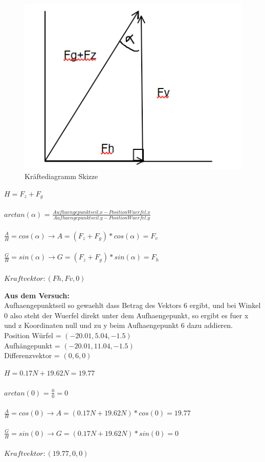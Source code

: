 \documentclass[../main.tex]{subfiles}
\begin{document}
     \begin{figure}[H]
               \begin{center}
                   \centerline{\includegraphics[width=155mm]{./images/Lab3Unity/KraefteDiagramm.png}}
                   \caption{Kräftediagramm Skizze}
                   \label{fig:KräfteDiagramm}
               \end{center}
     \end{figure}
\begin{mdframed}
$H = F_z +F_g$\\\\
$arctan(\alpha)$ = $\frac{Aufhaengepunktseil.x-Position Wuerfel.x }{Aufhaengepunktseil.y-Position Wuerfel.y }$\\\\
$\frac{A}{H}= cos(\alpha) \rightarrow A = (F_z + F_g) * cos(\alpha)= F_v$\\\\
$\frac{G}{H}= sin(\alpha) \rightarrow G = (F_z + F_g) * sin(\alpha)= F_h$\\\\
$Kraftvektor: (Fh,Fv,0)$
\end{mdframed}
\textbf {Aus dem Versuch:\\}
Aufhaengepunktseil so gewaehlt dass Betrag des Vektors 6 ergibt, und bei Winkel 0 also steht der Wuerfel direkt unter dem Aufhaengepunkt, so ergibt es fuer x und z Koordinaten null und zu y beim Aufhaengepunkt 6 dazu addieren.\\
Position Würfel = $(-20.01,5.04,-1.5)$\\
Aufhängepunkt = $(-20.01,11.04,-1.5)$\\
Differenzvektor = $(0,6,0)$\\
\begin{mdframed}
$H = 0.17N +19.62N = 19.77$\\\\
$arctan(0)$ = $\frac{0}{0} = 0$\\\\
$\frac{A}{H}= cos(0) \rightarrow A = (0.17N +19.62N) * cos(0)= 19.77$\\\\
$\frac{G}{H}= sin(0) \rightarrow G = (0.17N +19.62N) * sin(0)= 0$\\\\
$Kraftvektor: (19.77,0,0)$
\end{mdframed}
\end{document}
